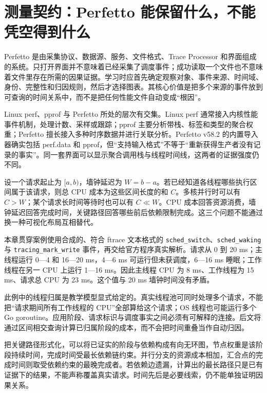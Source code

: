 \documentclass[UTF8,fontset=fandol,openany,11pt]{ctexbook}
\begin{document}
\section{测量契约：Perfetto 能保留什么，不能凭空得到什么}

Perfetto 是由采集协议、数据源、服务、文件格式、Trace Processor 和界面组成的系统。只打开界面并不意味着已经采集了调度事件；成功读取一个文件也不意味着文件里存在所需的因果证据。学习时应首先确定观察对象、事件来源、时间域、身份、完整性和归因规则，然后才选择图表。其核心价值是把多个来源的事件放到可查询的时间关系中，而不是把任何性能文件自动变成“根因”。\cite{pf-service}\cite{pf-architecture}


Linux perf、pprof 与 Perfetto 所处的层次有交集。Linux perf 通常接入内核性能事件机制，处理计数、采样或跟踪；pprof 主要分析带栈、标签和类型的聚合权重；Perfetto 擅长接入多种时序数据并进行关联分析。Perfetto v58.2 的内置导入器确实包括 perf.data 和 pprof，但“支持输入格式”不等于“重新获得生产者没有记录的事实”。同一套界面可以显示聚合调用栈与线程时间线，这两者的证据强度仍不同。\cite{pf-importers}\cite{pf-pprof}


设一个请求起止为 \([a,b)\)，墙钟延迟为 \(W=b-a\)。若已经知道各线程哪些执行区间属于该请求，则总 CPU 成本为这些区间长度的和 \(C\)。多核并行时可以有 \(C>W\)；某个请求长时间等待时也可以有 \(C\ll W\)。CPU 成本回答资源消费，墙钟延迟回答完成时间，关键路径回答哪些前后依赖限制完成。这三个问题不能通过换一种可视化布局互相替代。


本章贯穿案例使用合成的、符合 ftrace 文本格式的 \texttt{sched\_\allowbreak{}switch}、\texttt{sched\_\allowbreak{}waking} 与 \texttt{tracing\_\allowbreak{}mark\_\allowbreak{}write} 事件，再交给官方程序真实解析。请求从 0 到 20 ms；主线程运行 0—4 和 16—20 ms，4—6 ms 可运行但未获调度，6—16 ms 睡眠；工作线程在另一 CPU 上运行 1—16 ms。因此主线程 CPU 为 8 ms、工作线程为 15 ms、请求总 CPU 为 23 ms。这个值与 20 ms 墙钟时间没有矛盾。\cite{pf-request}


此例中的线程归属是教学模型显式给定的。真实线程池可同时处理多个请求，不能把“请求期间所有工作线程的 CPU”全部算给这个请求；OS 线程也可能运行多个 Go goroutine。应用阶段、请求标识与调度事实之间必须有可解释的连接。后文将通过区间相交查询计算已归属阶段的成本，而不会把时间重叠当作自动归因。


把关键路径形式化，可以将已证实的阶段与依赖构成有向无环图，节点权重是该阶段持续时间，完成时间受最长依赖链约束。并行分支的资源成本相加，汇合点的完成时间则取受依赖约束的最晚完成者。若依赖边遗漏，计算出的最长路径只是已有证据下的结果，不能声称覆盖真实请求。时间先后是必要线索，仍不能单独证明因果关系。
\end{document}
